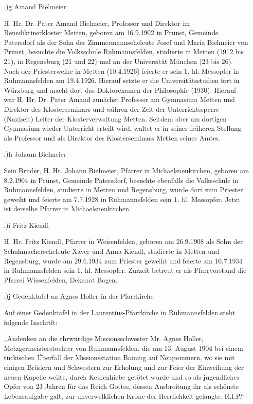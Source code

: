 .)g Amand Bielmeier

H. Hr. Dr. Pater Amand Bielmeier, Professor und Direktor im Benediktinerkloster
Metten, geboren am 16.9.1902 in Prünst, Gemeinde Patersdorf als der Sohn der
Zimmermannseheleute Josef und Maria Bielmeier von Prünst, besuchte die
Volksschule Ruhmannsfelden, studierte in Metten (1912 bis 21), in Regensburg (21
und 22) und an der Universität München (23 bis 26). Nach der Priesterweihe in
Metten (10.4.1926) feierte er sein 1. hl. Messopfer in Ruhmannsfelden am
19.4.1926. Hierauf setzte er die Universitätsstudien fort in Würzburg und macht
dort das Doktorexamen der Philosophie (1930). Hierauf war H. Hr. Dr. Pater Amand
zunächst Professor am Gymnasium Metten und Direktor des Klosterseminars und
währen der Zeit der Unterrichtssperre (Nazizeit) Leiter der Klosterverwaltung
Metten. Seitdem aber am dortigen Gymnasium wieder Unterricht erteilt wird,
waltet er in seiner früheren Stellung als Professor und als Direktor des
Klosterseminars Metten seines Amtes.

.)h Johann Bielmeier

Sein Bruder, H. Hr. Johann Bielmeier, Pfarrer in Michaelsneukirchen, geboren am
8.2.1904 in Prünst, Gemeinde Patersdorf, besuchte ebenfalls die Volksschule in
Ruhmannsfelden, studierte in Metten und Regensburg, wurde dort zum Priester
geweiht und feierte am 7.7.1928 in Ruhmannsfelden sein 1. hl. Messopfer. Jetzt
ist derselbe Pfarrer in Michaelsneukirchen.

.)i Fritz Kiendl

H. Hr. Fritz Kiendl, Pfarrer in Weisenfelden, geboren am 26.9.1908 als Sohn der
Schuhmacherseheleute Xaver und Anna Kiendl, studierte in Metten und Regensburg,
wurde am 29.6.1934 zum Priester geweiht und feierte am 10.7.1934 in
Ruhmannsfelden sein 1. hl. Messopfer. Zurzeit betreut er als Pfarrvorstand die
Pfarrei Wiesenfelden, Dekanat Bogen.

.)j Gedenktafel an Agnes Holler in der Pfarrkirche

Auf einer Gedenktafel in der Laurentius-Pfarrkirche in Ruhmannsfelden steht
folgende Inschrift:

„Andenken an die ehrwürdige Missionsschwester Mr. Agnes Holler,
Metzgermeisterstochter von Ruhmannsfelden, die am 13. August 1904 bei einem
tückischen Überfall der Missionsstation Baining auf Neupommern, wo sie mit
einigen Brüdern und Schwestern zur Erholung und zur Feier der Einweihung der
neuen Kapelle weilte, durch Keulenhiebe getötet wurde und so als jugendliches
Opfer von 23 Jahren für das Reich Gottes, dessen Ausbreitung ihr als schönste
Lebensaufgabe galt, zur unverwelklichen Krone der Herrlichkeit gelangte. R.I.P.“

